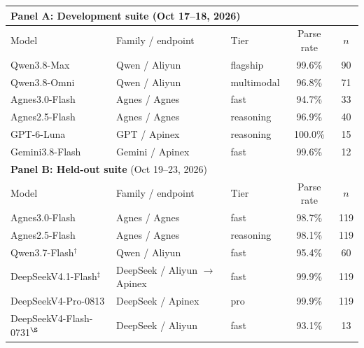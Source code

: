 \begin{tabular*}{\columnwidth}{@{\extracolsep{\fill}} l l l c c}
\toprule
\multicolumn{5}{l}{\textbf{Panel A: Development suite} (Oct 17--18, 2026)} \\
\midrule
Model & Family / endpoint & Tier & Parse rate & $n$ \\
\midrule
Qwen3.8-Max & Qwen / Aliyun & flagship & 99.6\% & 90 \\
Qwen3.8-Omni & Qwen / Aliyun & multimodal & 96.8\% & 71 \\
Agnes3.0-Flash & Agnes / Agnes & fast & 94.7\% & 33 \\
Agnes2.5-Flash & Agnes / Agnes & reasoning & 96.9\% & 40 \\
GPT-6-Luna & GPT / Apinex & reasoning & 100.0\% & 15 \\
Gemini3.8-Flash & Gemini / Apinex & fast & 99.6\% & 12 \\
\midrule
\multicolumn{5}{l}{\textbf{Panel B: Held-out suite} (Oct 19--23, 2026)} \\
\midrule
Model & Family / endpoint & Tier & Parse rate & $n$ \\
\midrule
Agnes3.0-Flash & Agnes / Agnes & fast & 98.7\% & 119 \\
Agnes2.5-Flash & Agnes / Agnes & reasoning & 98.1\% & 119 \\
Qwen3.7-Flash$^{\dagger}$ & Qwen / Aliyun & fast & 95.4\% & 60 \\
DeepSeekV4.1-Flash$^{\ddagger}$ & DeepSeek / Aliyun $\to$ Apinex & fast & 99.9\% & 119 \\
DeepSeekV4-Pro-0813 & DeepSeek / Apinex & pro & 99.9\% & 119 \\
DeepSeekV4-Flash-0731$^{\S}$ & DeepSeek / Aliyun & fast & 93.1\% & 13 \\
\bottomrule
\end{tabular*}
